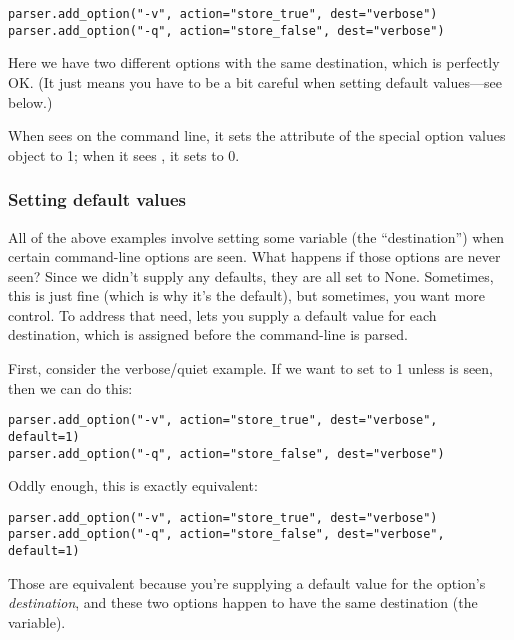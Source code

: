 \begin{verbatim}
parser.add_option("-v", action="store_true", dest="verbose")
parser.add_option("-q", action="store_false", dest="verbose")
\end{verbatim}

Here we have two different options with the same destination, which is
perfectly OK.  (It just means you have to be a bit careful when setting
default values---see below.)

When  sees  on the command line, it
sets the  attribute of the special {option values}
object to 1; when it sees , it sets  to
0.

\subsubsection{Setting default values\label{optparse-setting-default-values}}

All of the above examples involve setting some variable (the
``destination'') when certain command-line options are seen.  What
happens if those options are never seen?  Since we didn't supply any
defaults, they are all set to None.  Sometimes, this is just fine
(which is why it's the default), but sometimes, you want more control.
To address that need,  lets you supply a default
value for each destination, which is assigned before the command-line
is parsed.

First, consider the verbose/quiet example.  If we want
 to set  to 1 unless  is
seen, then we can do this:

\begin{verbatim}
parser.add_option("-v", action="store_true", dest="verbose", default=1)
parser.add_option("-q", action="store_false", dest="verbose")
\end{verbatim}

Oddly enough, this is exactly equivalent:

\begin{verbatim}
parser.add_option("-v", action="store_true", dest="verbose")
parser.add_option("-q", action="store_false", dest="verbose", default=1)
\end{verbatim}

Those are equivalent because you're supplying a default value for the
option's \emph{destination}, and these two options happen to have the same
destination (the  variable).

